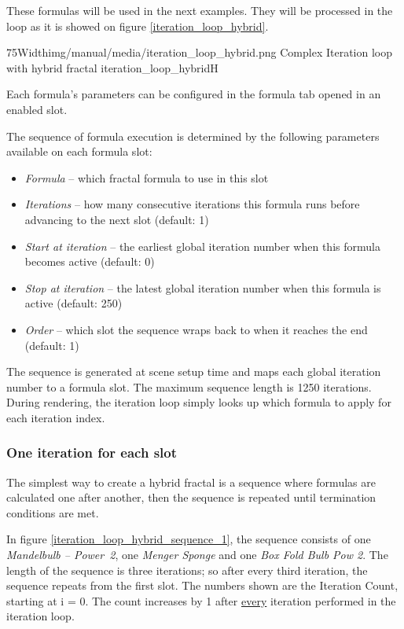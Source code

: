 These formulas will be
used in the next examples. They will be processed in the loop as it is showed on figure \ref{iteration_loop_hybrid}.

\simpleImageWithCaption75Width{img/manual/media/iteration_loop_hybrid.png}
{Complex Iteration loop with hybrid fractal}
{iteration_loop_hybrid}{H}

Each formula's parameters can be configured in the formula tab opened in an enabled slot.

The sequence of formula execution is determined by the following parameters available on each formula slot:
\begin{itemize}
	\item \emph{Formula} -- which fractal formula to use in this slot
	\item \emph{Iterations} -- how many consecutive iterations this formula runs before advancing to the next slot (default: 1)
	\item \emph{Start at iteration} -- the earliest global iteration number when this formula becomes active (default: 0)
	\item \emph{Stop at iteration} -- the latest global iteration number when this formula is active (default: 250)
	\item \emph{Order} -- which slot the sequence wraps back to when it reaches the end (default: 1)
\end{itemize}

The sequence is generated at scene setup time and maps each global iteration number to a formula slot. The maximum sequence length is 1250 iterations. During rendering, the iteration loop simply looks up which formula to apply for each iteration index.

\subsubsection{One iteration for each slot}

The simplest way to create a hybrid fractal is a sequence where formulas are calculated one after another, then the sequence is repeated until termination conditions are met.

In figure \ref{iteration_loop_hybrid_sequence_1}, the sequence consists of one \emph{Mandelbulb -- Power~2}, one \emph{Menger Sponge} and
one \emph{Box Fold Bulb Pow 2}. The length of the sequence is three iterations; so after every third iteration, the sequence repeats from the first slot. The numbers shown are the Iteration Count, starting at i = 0. The count increases by 1 after \underline{every} iteration performed in the iteration loop.

